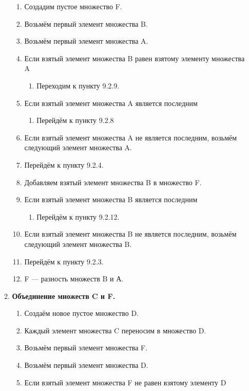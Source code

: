 \documentclass[a4paper,12pt]{extarticle}
\begin{document}
\begin{enumerate}
\begin{enumerate}[label*=\arabic*.]
\begin{enumerate}[label*=\arabic*.]
      \item Создадим пустое множество F.
      \item Возьмём первый элемент множества B.
      \item Возьмём первый элемент множества A.
      \item Если взятый элемент множества B равен взятому элементу множества A
      \begin{enumerate}[label*=\arabic*.]
        \item Переходим к пункту 9.2.9.
      \end{enumerate}
      \item Если взятый элемент множества A является последним
      \begin{enumerate}
        \item Перейдём к пункту 9.2.8
      \end{enumerate}
      \item Если взятый элемент множества A не является последним, возьмём следующий элемент множества A.
      \item Перейдём к пункту 9.2.4.
      \item Добавляем взятый элемент множества B в множество F.
      \item Если взятый элемент множества B является последним
      \begin{enumerate}[label*=\arabic*.]
        \item Перейдём к пункту 9.2.12.
      \end{enumerate}
      \item Если взятый элемент множества B не является последним, возьмём следующий элемент множества B.
      \item Перейдём к пункту 9.2.3.
      \item F — разность множеств B и А.
    \end{enumerate}
    \item\textbf{Объединение множеств C и F.}
    \begin{enumerate}[label*=\arabic*.]
      \item Создаём новое пустое множество D.
      \item Каждый элемент множества C переносим в множество D.
      \item Возьмём первый элемент множества F.
      \item Возьмём первый элемент множества D.
      \item Если взятый элемент множества F не равен взятому элементу D
      \begin{enumerate}[label*=\arabic*.]

\end{enumerate}
\end{enumerate}
\end{enumerate}
\end{enumerate}
\end{document}

